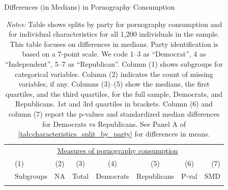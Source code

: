 \documentclass[12pt, letterpaper]{article}
\begin{document}
\begin{table}[ht] \centering \small \setlength\tabcolsep{5 pt}
	\caption{Differences (in Medians) in Pornography Consumption}
	\label{tab:characteristics_split_by_party_medians}
	\begin{adjustbox}{max width=\textwidth}
		\begin{tabular}{@{\hspace{0\tabcolsep}}llrcccrr@{\hspace{0\tabcolsep}}}
			\toprule
			&\multicolumn{7}{c}{\underline{Measures of pornography consumption}}\\
			&\multicolumn{1}{l}{(1)}&\multicolumn{1}{c}{(2)}&\multicolumn{1}{c}{(3)}&\multicolumn{1}{c}{(4)}&\multicolumn{1}{c}{(5)}&\multicolumn{1}{c}{(6)}&\multicolumn{1}{r}{(7)}\\			
			&\multicolumn{1}{l}{Subgroups}&\multicolumn{1}{c}{NA}&\multicolumn{1}{c}{Total}&\multicolumn{1}{c}{Democrats}&\multicolumn{1}{c}{Republicans}&\multicolumn{1}{c}{P-val}&\multicolumn{1}{r}{SMD}\\
			\cmidrule{2-8}
			\\
			\bottomrule
		\end{tabular}
	\end{adjustbox}
	\caption*{\scriptsize \emph{Notes:}
		Table shows splits by party for pornography consumption and for individual characteristics for all 1,200 individuals in the sample.
		This table focuses on differences in medians.
		Party identification is based on a 7-point scale. We code 1--3 as ``Democrat'', 4 as ``Independent'', 5--7 as ``Republican''.
		Column (1) shows subgroups for categorical variables.
		Column (2) indicates the count of missing variables, if any.
		Columns (3)--(5) show the medians, the first quartiles, and the third quartiles, for the full sample, Democrats, and Republicans.
		1st and 3rd quartiles in brackets.
		Column (6) and column (7) report the p-values and standardized median differences for Democrats vs Republicans.
		See Panel A of \cref{tab:characteristics_split_by_party} for differences in means.
	}
\end{table}
\end{document}
